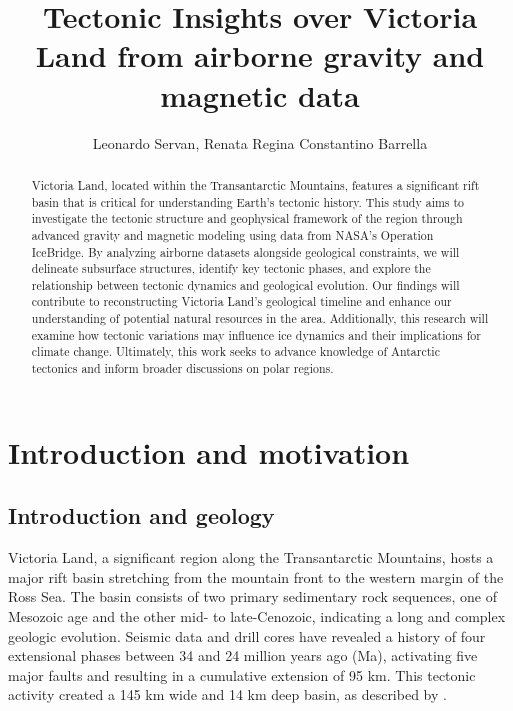 \documentclass{article}
\newcommand{\Title}{Tectonic Insights over Victoria Land from airborne gravity and magnetic data}
\begin{document}
\title{\Title}
\author{Leonardo Servan, Renata Regina Constantino Barrella}

\maketitle

\begin{abstract}
Victoria Land, located within the Transantarctic Mountains, 
features a significant rift basin that is critical for 
understanding Earth's tectonic history. This study aims to 
investigate the tectonic structure and geophysical framework of 
the region through advanced gravity and magnetic modeling using 
data from NASA’s Operation IceBridge. By analyzing airborne datasets 
alongside geological constraints, we will delineate subsurface structures, 
identify key tectonic phases, and explore the relationship between tectonic 
dynamics and geological evolution. Our findings will contribute to 
reconstructing Victoria Land's geological timeline and enhance our understanding 
of potential natural resources in the area. Additionally, this research will 
examine how tectonic variations may influence ice dynamics and their implications 
for climate change. Ultimately, this work seeks to advance knowledge of Antarctic 
tectonics and inform broader discussions on polar regions.

\end{abstract}

\section{Introduction and motivation}
\label{sec:intro}
	\subsection{Introduction and geology}
	\label{ssec:intro_geology}

	Victoria Land, a significant region along the Transantarctic Mountains, 
	hosts a major rift basin stretching from the mountain front to the western 
	margin of the Ross Sea. The basin consists of two primary sedimentary rock 
	sequences, one of Mesozoic age and the other mid- to late-Cenozoic, indicating 
	a long and complex geologic evolution. Seismic data and drill cores have revealed 
	a history of four extensional phases between 34 and 24 million years ago (Ma), 
	activating five major faults and resulting in a cumulative extension of 95 km. 
	This tectonic activity created a 145 km wide and 14 km deep basin, as described by \citet{Davey2006}.
\end{document}
